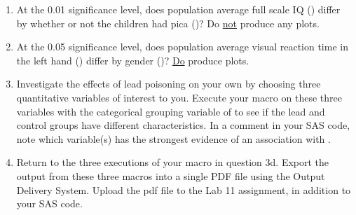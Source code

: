 \begin{enumerate}
\begin{enumerate}
\bi
\item At the 0.01 significance level, does population average full scale IQ () differ by whether or not the children had pica ()?  Do \underline{not} produce any plots.
\item At the 0.05 significance level, does population average visual reaction time in the left hand () differ by gender ()?  \underline{Do} produce plots.
\ei
\item Investigate the effects of lead poisoning on your own by choosing three quantitative variables of interest to you.  Execute your macro on these three variables with the categorical grouping variable of \underline{} to see if the lead and control groups have different characteristics.  In a comment in your SAS code, note which variable(s) has the strongest evidence of an association with .
\item Return to the three executions of your macro in question 3d.  Export the output from these three macros into a single PDF file using the Output Delivery System.  Upload the pdf file to the Lab 11 assignment, in addition to your SAS code.
\end{enumerate}
\end{enumerate}
 